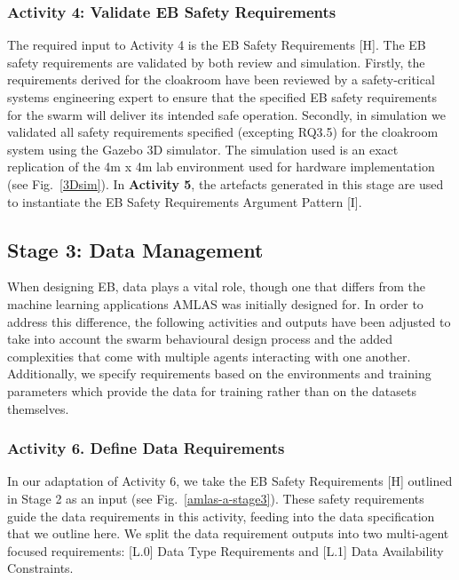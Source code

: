 \documentclass[runningheads]{llncs}
\begin{document}
\subsubsection*{Activity 4: Validate EB Safety Requirements}

The required input to Activity 4 is the EB Safety Requirements [H].  
The EB safety requirements are validated by both review and simulation.
Firstly, the requirements derived for the cloakroom have been reviewed by a safety-critical systems engineering expert to ensure that the specified EB safety requirements for the swarm will deliver its intended safe operation. Secondly, in simulation we validated all safety requirements specified (excepting RQ3.5) for the cloakroom system using the Gazebo 3D simulator. 
The simulation used is an exact replication of the 4m x 4m lab environment used for hardware implementation (see Fig.~\ref{3Dsim}). 
In \textbf{Activity 5}, the artefacts generated in this stage are used to instantiate the EB Safety Requirements Argument Pattern [I].



\subsection{Stage 3: Data Management} \label{framework-stage3}
When designing EB, data plays a vital role, though one that differs from the machine learning applications AMLAS was initially designed for. In order to address this difference, the following activities and outputs have been adjusted to take into account the swarm behavioural design process and the added complexities that come with multiple agents interacting with one another. Additionally, we specify requirements based on the environments and training parameters which provide the data for training rather than on the datasets themselves.

\subsubsection*{Activity 6. Define Data Requirements}
In our adaptation of Activity 6, we take the EB Safety Requirements [H] outlined in Stage 2 as an input (see Fig.~\ref{amlas-a-stage3}). These safety requirements guide the data requirements in this activity, feeding into the data specification that we outline here. We split the data requirement outputs into two multi-agent focused requirements: [L.0] Data Type Requirements and [L.1] Data Availability Constraints.
\end{document}
